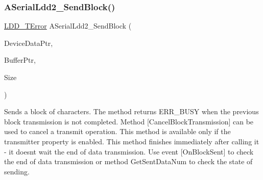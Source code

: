 \subsubsection{\texorpdfstring{A\+Serial\+Ldd2\+\_\+\+Send\+Block()}{ASerialLdd2\_SendBlock()}}
{\footnotesize\ttfamily \hyperlink{group___p_e___types__module_ga24c2b045fd04e79e85f261ce4df35588}{L\+D\+D\+\_\+\+T\+Error} A\+Serial\+Ldd2\+\_\+\+Send\+Block (\begin{DoxyParamCaption}\item[{\hyperlink{group___p_e___types__module_gac5cf1362f1f0e3a2ce71b1bf2276d091}{L\+D\+D\+\_\+\+T\+Device\+Data} $\ast$}]{Device\+Data\+Ptr,  }\item[{\hyperlink{group___p_e___types__module_gade8ef9401405bd941b6da738b807f980}{L\+D\+D\+\_\+\+T\+Data} $\ast$}]{Buffer\+Ptr,  }\item[{uint16\+\_\+t}]{Size }\end{DoxyParamCaption})}



Sends a block of characters. The method returns E\+R\+R\+\_\+\+B\+U\+SY when the previous block transmission is not completed. Method \mbox{[}Cancel\+Block\+Transmission\mbox{]} can be used to cancel a transmit operation. This method is available only if the transmitter property is enabled. This method finishes immediately after calling it -\/ it doesn\textquotesingle{}t wait the end of data transmission. Use event \mbox{[}On\+Block\+Sent\mbox{]} to check the end of data transmission or method Get\+Sent\+Data\+Num to check the state of sending. 


